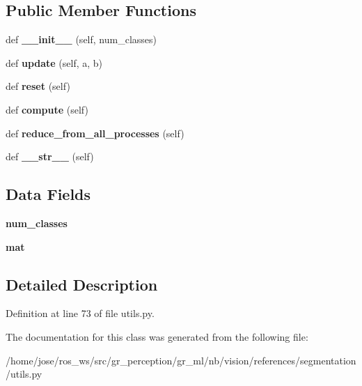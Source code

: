 \subsection*{Public Member Functions}
\begin{DoxyCompactItemize}
\item 
\mbox{\label{classutils_1_1ConfusionMatrix_afcfc1686fd7727017b939ace092ca029}} 
def {\bfseries \+\_\+\+\_\+init\+\_\+\+\_\+} (self, num\+\_\+classes)
\item 
\mbox{\label{classutils_1_1ConfusionMatrix_a16ae20409a18fdc1a192b1453edf9f5d}} 
def {\bfseries update} (self, a, b)
\item 
\mbox{\label{classutils_1_1ConfusionMatrix_a5a8edb7d8182891bcd577203a9570b0b}} 
def {\bfseries reset} (self)
\item 
\mbox{\label{classutils_1_1ConfusionMatrix_ae92a2c7559a2e2aba9671dccbb97f492}} 
def {\bfseries compute} (self)
\item 
\mbox{\label{classutils_1_1ConfusionMatrix_a59090a85ff665b53c8370ad3a293f222}} 
def {\bfseries reduce\+\_\+from\+\_\+all\+\_\+processes} (self)
\item 
\mbox{\label{classutils_1_1ConfusionMatrix_a4cfffc72434f45a8694c12975e50a0e4}} 
def {\bfseries \+\_\+\+\_\+str\+\_\+\+\_\+} (self)
\end{DoxyCompactItemize}
\subsection*{Data Fields}
\begin{DoxyCompactItemize}
\item 
\mbox{\label{classutils_1_1ConfusionMatrix_abd5189e9d764cf3e2c4d6331d3789c6c}} 
{\bfseries num\+\_\+classes}
\item 
\mbox{\label{classutils_1_1ConfusionMatrix_a357236316d47ee7d89da2898faec11a4}} 
{\bfseries mat}
\end{DoxyCompactItemize}


\subsection{Detailed Description}


Definition at line 73 of file utils.\+py.



The documentation for this class was generated from the following file\+:\begin{DoxyCompactItemize}
\item 
/home/jose/ros\+\_\+ws/src/gr\+\_\+perception/gr\+\_\+ml/nb/vision/references/segmentation/utils.\+py\end{DoxyCompactItemize}
